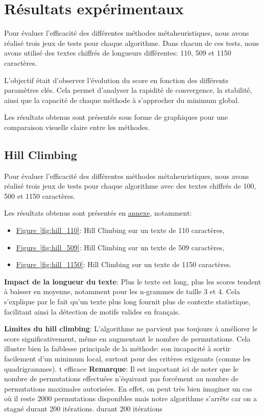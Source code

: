 \documentclass[a4paper]{article}
\begin{document}
\section{Résultats expérimentaux}

Pour évaluer l’efficacité des différentes méthodes métaheuristiques, nous avons réalisé trois jeux de tests pour chaque algorithme. Dans chacun de ces tests, nous avons utilisé des textes chiffrés de longueurs différentes: 110, 509 et 1150 caractères.

L'objectif était d'observer l’évolution du score en fonction des différents paramètres clés. Cela permet d’analyser la rapidité de convergence, la stabilité, ainsi que la capacité de chaque méthode à s’approcher du minimum global.

Les résultats obtenus sont présentés sous forme de graphiques pour une comparaison visuelle claire entre les méthodes.

\subsection{Hill Climbing}

Pour évaluer l’efficacité des différentes méthodes métaheuristiques, nous avons réalisé trois jeux de tests pour chaque algorithme avec des textes chiffrés de 100, 500 et 1150 caractères.

Les résultats obtenus sont présentés en \hyperref[sec:annexes]{annexe}, notamment:
\begin{itemize}
    \item \hyperref[fig:hill_110]{Figure~\ref*{fig:hill_110}}: Hill Climbing sur un texte de 110 caractères,
    \item \hyperref[fig:hill_509]{Figure~\ref*{fig:hill_509}}: Hill Climbing sur un texte de 509 caractères,
    \item \hyperref[fig:hill_1150]{Figure~\ref*{fig:hill_1150}}: Hill Climbing sur un texte de 1150 caractères.
\end{itemize}

\textbf{Impact de la longueur du texte}: Plus le texte est long, plus les scores tendent à baisser en moyenne, notamment pour les n-grammes de taille $3$ et $4$. Cela s'explique par le fait qu’un texte plus long fournit plus de contexte statistique, facilitant ainsi la détection de motifs valides en français.

\textbf{Limites du hill climbing}: L’algorithme ne parvient pas toujours à améliorer le score significativement, même en augmentant le nombre de permutations. Cela illustre bien la faiblesse principale de la méthode: son incapacité à sortir facilement d’un minimum local, surtout pour des critères exigeants (comme les quadrigrammes).
t efficace 
\textbf{Remarque}: Il est important ici de noter que le nombre de permutations effectuées n'équivaut pas forcément au nombre de permutations maximales autorisées. En effet, on peut très bien imaginer un cas où il reste 2000 permutations disponibles mais notre algorithme s'arrête car on a stagné durant 200 itérations.
durant 200 itérations
\end{document}
